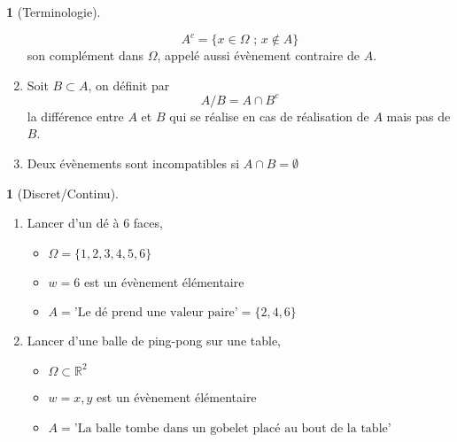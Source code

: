\documentclass[8pt,notheorems]{beamer}
\theoremstyle{definition}
\newtheorem{definition}{\translate{Definition}}
\theoremstyle{example}
\newtheorem{example}{\translate{Exemple}}
\theoremstyle{mystyle}
\theoremstyle{plain}
\begin{document}
\begin{frame}[allowframebreaks]
\begin{definition}[Terminologie]
\begin{enumerate}
$$    A^c = \{x\in\Omega\text{ ; }x\notin A\}
    $$
    son complément dans $\Omega$, appelé aussi évènement contraire de $A$.
    \item Soit $B\subset A$, on définit par 
    $$
    A/B = A\cap B^c
    $$ 
    la différence entre $A$ et $B$ qui se réalise en cas de réalisation de $A$ mais pas de $B$. 
    \item Deux évènements sont incompatibles si $A\cap B = \emptyset$
\end{enumerate}
\end{definition}
\begin{example}[Discret/Continu]
\begin{enumerate}
\item Lancer d'un dé à $6$ faces,
\begin{itemize}
\item $\Omega=\{1,2,3,4,5,6\}$
\item $w={6}$ est un évènement élémentaire
\item $A = \text{'Le dé prend une valeur paire'}=\{2,4,6\}$
\end{itemize}
\item Lancer d'une balle de ping-pong sur une table,
\begin{itemize}
\item $\Omega\subset\mathbb{R}^{2}$
\item $w={x,y}$ est un évènement élémentaire
\item $A = \text{'La balle tombe dans un gobelet placé au bout de la table'}$
\end{itemize}
\end{enumerate}
\end{example}
\end{frame}
\end{document}
